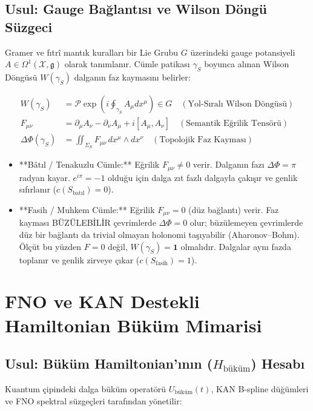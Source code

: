\documentclass[11pt, a4paper]{article}
\begin{document}
\subsection{Usul: Gauge Bağlantısı ve Wilson Döngü Süzgeci}
Gramer ve fıtrî mantık kuralları bir Lie Grubu $G$ üzerindeki gauge potansiyeli $A \in \Omega^1(\mathcal{X}, \mathfrak{g})$ olarak tanımlanır. Cümle patikası $\gamma_S$ boyunca alınan Wilson Döngüsü $W(\gamma_S)$ dalganın faz kaymasını belirler:

\begin{align}
W(\gamma_S) &= \mathcal{P} \exp \left( i \oint_{\gamma_S} A_\mu dx^\mu \right) \in G \quad (\text{Yol-Sıralı Wilson Döngüsü}) \\
F_{\mu\nu} &= \partial_\mu A_\nu - \partial_\nu A_\mu + i [A_\mu, A_\nu] \quad (\text{Semantik Eğrilik Tensörü}) \\
\Delta \Phi(\gamma_S) &= \iint_{\Sigma_S} F_{\mu\nu} \, dx^\mu \wedge dx^\nu \quad (\text{Topolojik Faz Kayması})
\end{align}

\begin{itemize}
    \item **Bâtıl / Tenakuzlu Cümle:** Eğrilik $F_{\mu\nu} \neq 0$ verir. Dalganın fazı $\Delta \Phi = \pi$ radyan kayar. $e^{i\pi} = -1$ olduğu için dalga zıt fazlı dalgayla çakışır ve genlik sıfırlanır ($c(S_{\text{batıl}}) = 0$).
    \item **Fasih / Muhkem Cümle:** Eğrilik $F_{\mu\nu} = 0$ (düz bağlantı) verir. Faz kayması BÜZÜLEBİLİR çevrimlerde $\Delta\Phi = 0$ olur; büzülemeyen çevrimlerde düz bir bağlantı da trivial olmayan holonomi taşıyabilir (Aharonov--Bohm). Ölçüt bu yüzden $F = 0$ değil, $W(\gamma_S) = \mathbf{1}$ olmalıdır. Dalgalar aynı fazda toplanır ve genlik zirveye çıkar ($c(S_{\text{fasih}}) = 1$).
\end{itemize}

\section{FNO ve KAN Destekli Hamiltonian Büküm Mimarisi}

\subsection{Usul: Büküm Hamiltonian'ının ($H_{\text{büküm}}$) Hesabı}
Kuantum çipindeki dalga büküm operatörü $U_{\text{büküm}}(t)$, KAN B-spline düğümleri ve FNO spektral süzgeçleri tarafından yönetilir:
\end{document}
